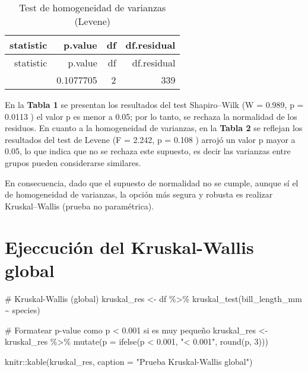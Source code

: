 \documentclass[
  spanish,
  11pt,
  a4paper,
  DIV=11,
  numbers=noendperiod]{scrartcl}
\newenvironment{Shaded}{\begin{snugshade}}{\end{snugshade}}
\newcommand{\AttributeTok}[1]{\textcolor[rgb]{0.40,0.45,0.13}{#1}}
\newcommand{\CommentTok}[1]{\textcolor[rgb]{0.37,0.37,0.37}{#1}}
\newcommand{\DecValTok}[1]{\textcolor[rgb]{0.68,0.00,0.00}{#1}}
\newcommand{\FloatTok}[1]{\textcolor[rgb]{0.68,0.00,0.00}{#1}}
\newcommand{\FunctionTok}[1]{\textcolor[rgb]{0.28,0.35,0.67}{#1}}
\newcommand{\NormalTok}[1]{\textcolor[rgb]{0.00,0.23,0.31}{#1}}
\newcommand{\OtherTok}[1]{\textcolor[rgb]{0.00,0.23,0.31}{#1}}
\newcommand{\SpecialCharTok}[1]{\textcolor[rgb]{0.37,0.37,0.37}{#1}}
\newcommand{\StringTok}[1]{\textcolor[rgb]{0.13,0.47,0.30}{#1}}
\begin{document}
\begin{longtable}[]{@{}rrrr@{}}
\caption{Test de homogeneidad de varianzas (Levene)}\tabularnewline
\toprule\noalign{}
statistic & p.value & df & df.residual \\
\midrule\noalign{}
\endfirsthead
\toprule\noalign{}
statistic & p.value & df & df.residual \\
\midrule\noalign{}
\endhead
\bottomrule\noalign{}
\endlastfoot
2.242456 & 0.1077705 & 2 & 339 \\
\end{longtable}

En la \textbf{Tabla 1} se presentan los resultados del test
Shapiro--Wilk (W = 0.989, p = 0.0113 ) el valor p es menor a 0.05; por
lo tanto, se rechaza la normalidad de los residuos. En cuanto a la
homogeneidad de varianzas, en la \textbf{Tabla 2} se reflejan los
resultados del test de Levene (F = 2.242, p = 0.108 ) arrojó un valor p
mayor a 0.05, lo que indica que no se rechaza este supuesto, es decir
las varianzas entre grupos pueden considerarse similares.

En consecuencia, dado que el supuesto de normalidad no se cumple, aunque
sí el de homogeneidad de varianzas, la opción más segura y robusta es
realizar Kruskal--Wallis (prueba no paramétrica).

\section{Ejeccución del Kruskal-Wallis
global}\label{ejeccuciuxf3n-del-kruskal-wallis-global}

\begin{Shaded}
\begin{Highlighting}[numbers=left,,]
\CommentTok{\# Kruskal{-}Wallis (global)}
\NormalTok{kruskal\_res }\OtherTok{\textless{}{-}}\NormalTok{ df }\SpecialCharTok{\%\textgreater{}\%} \FunctionTok{kruskal\_test}\NormalTok{(bill\_length\_mm }\SpecialCharTok{\textasciitilde{}}\NormalTok{ species)}

\CommentTok{\# Formatear p{-}value como p \textless{} 0.001 si es muy pequeño}
\NormalTok{kruskal\_res }\OtherTok{\textless{}{-}}\NormalTok{ kruskal\_res }\SpecialCharTok{\%\textgreater{}\%}
  \FunctionTok{mutate}\NormalTok{(}\AttributeTok{p =} \FunctionTok{ifelse}\NormalTok{(p }\SpecialCharTok{\textless{}} \FloatTok{0.001}\NormalTok{, }\StringTok{"\textless{} 0.001"}\NormalTok{, }\FunctionTok{round}\NormalTok{(p, }\DecValTok{3}\NormalTok{)))}

\NormalTok{knitr}\SpecialCharTok{::}\FunctionTok{kable}\NormalTok{(kruskal\_res, }\AttributeTok{caption =} \StringTok{"Prueba Kruskal{-}Wallis global"}\NormalTok{)}
\end{Highlighting}
\end{Shaded}
\end{document}
